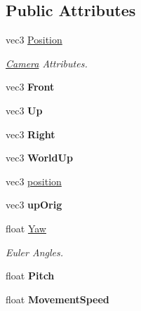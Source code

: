 \subsection*{Public Attributes}
\begin{DoxyCompactItemize}
\item 
\mbox{\label{classCamera_a28ae256428afe91a894b99584bdcfe4f}} 
vec3 \hyperlink{classCamera_a28ae256428afe91a894b99584bdcfe4f}{Position}
\begin{DoxyCompactList}\small\item\em \hyperlink{classCamera}{Camera} Attributes. \end{DoxyCompactList}\item 
\mbox{\label{classCamera_ae8fefdb9e27290a00d9c70be77086bc6}} 
vec3 {\bfseries Front}
\item 
\mbox{\label{classCamera_a17c45b2bf09c165a4cf1aff793f628d7}} 
vec3 {\bfseries Up}
\item 
\mbox{\label{classCamera_a1c47a3264f5bc15356de0319df40696a}} 
vec3 {\bfseries Right}
\item 
\mbox{\label{classCamera_a45f586b01107a672129db3381e60e3f0}} 
vec3 {\bfseries World\+Up}
\item 
vec3 \hyperlink{classCamera_a6bd96884fb5fb652b71042f2d7f0122c}{position}
\item 
\mbox{\label{classCamera_a21683f89507e000b6a0ebabff08ac8a2}} 
vec3 {\bfseries up\+Orig}
\item 
\mbox{\label{classCamera_a1a1354a2bd2df7f18ef82924e671d241}} 
float \hyperlink{classCamera_a1a1354a2bd2df7f18ef82924e671d241}{Yaw}
\begin{DoxyCompactList}\small\item\em Euler Angles. \end{DoxyCompactList}\item 
\mbox{\label{classCamera_af9c8f223bb06bb74fc77c586545e7e67}} 
float {\bfseries Pitch}
\item 
\mbox{\label{classCamera_a63221392d762df6a74f45bc9d43a2f61}} 
float {\bfseries Movement\+Speed}

\end{DoxyCompactItemize}
